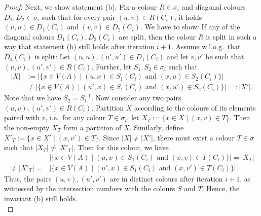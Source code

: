 \documentclass[10pt,a4paper]{article}
\begin{document}
\begin{proof}
			Next, we show statement (b). Fix a colour $R \in \sigma_i$ and diagonal colours $D_1,D_2 \in \sigma_i$ such that for every pair $(u,v) \in R(C_i)$, it holds $(u,u) \in D_1(C_i)$ and $(v,v) \in D_2(C_i)$. We have to show: If any of the diagonal colours $D_1(C_i), D_2(C_i)$ are split, then the colour $R$ is split in such a way that statement (b) still holds after iteration $i+1$.
			Assume w.l.o.g.\ that $D_1(C_i)$ is split: Let $(u,u),(u',u') \in D_1(C_i)$ and let $v,v'$ be such that $(u,v), (u',v') \in R(C_i)$. Further, let $S_1, S_2 \in \sigma_i$ such that
			\begin{align*}
				|X | &:= |\{ x \in V(A) \mid (u,x) \in S_1(C_i) \text{ and } (x,u) \in S_2(C_i)  \}|\\
				& \neq |\{ x \in V(A) \mid (u',x) \in S_1(C_i) \text{ and } (x,u') \in S_2(C_i) \}| =: | X' | .
			\end{align*}
			Note that we have $S_2 = S_1^{-1}$.
			Now consider any two pairs $(u,v), (u',v') \in R(C_i)$. Partition $X$ according to the colours of its elements paired with $v$, i.e.\ for any colour $T \in \sigma_i$, let $X_T := \{ x \in X \mid (x,v) \in T \}$. Then the non-empty $X_T$ form a partition of $X$. Similarly, define $X'_T := \{ x \in X' \mid (x,v') \in T \}$. Since $|X| \neq |X'|$, there must exist a colour $T \in \sigma$ such that $|X_T| \neq |X'_T|$. Then for this colour, we have 
			\begin{align*}
				&|\{ x \in V(A) \mid (u,x) \in S_1(C_i) \text{ and } (x,v) \in T(C_i)  \}| = |X_T| \\
				\neq |X'_T| = &|\{ x \in V(A) \mid (u',x) \in S_1(C_i) \text{ and } (x,v') \in T(C_i) \}|.
			\end{align*}
			Thus, the pairs $(u,v), (u',v')$ are in distinct colours after iteration $i+1$, as witnessed by the intersection numbers with the colours $S$ and $T$. Hence, the invariant (b) still holds.\\
			

\end{proof}
\end{document}
